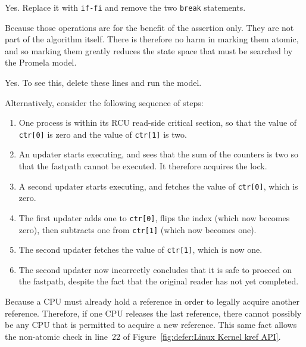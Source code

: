 
Yes.  Replace it with {\tt if-fi} and remove the two {\tt break} statements.


Because those operations are for the benefit of the
assertion only.  They are not part of the algorithm itself.
There is therefore no harm in marking them atomic, and
so marking them greatly reduces the state space that must
be searched by the Promela model.


Yes.  To see this, delete these lines and run the model.

Alternatively, consider the following sequence of steps:

\begin{enumerate}
\item	One process is within its RCU read-side critical
	section, so that the value of {\tt ctr[0]} is zero and
	the value of {\tt ctr[1]} is two.
\item	An updater starts executing, and sees that the sum of
	the counters is two so that the fastpath cannot be
	executed.  It therefore acquires the lock.
\item	A second updater starts executing, and fetches the value
	of {\tt ctr[0]}, which is zero.
\item	The first updater adds one to {\tt ctr[0]}, flips
	the index (which now becomes zero), then subtracts
	one from {\tt ctr[1]} (which now becomes one).
\item	The second updater fetches the value of {\tt ctr[1]},
	which is now one.
\item	The second updater now incorrectly concludes that it
	is safe to proceed on the fastpath, despite the fact
	that the original reader has not yet completed.
\end{enumerate}


	  Because a CPU must already hold a reference in order
	  to legally acquire another reference.
	  Therefore, if one CPU releases the last reference,
	  there cannot possibly be any CPU that is permitted
	  to acquire a new reference.
	  This same fact allows the non-atomic check in line~22
	  of Figure~\ref{fig:defer:Linux Kernel kref API}.


